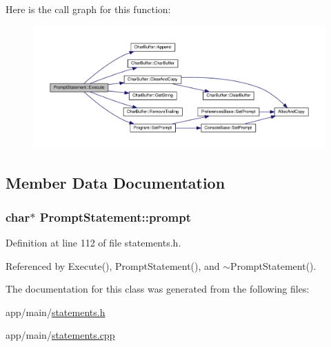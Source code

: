 Here is the call graph for this function\+:\nopagebreak
\begin{figure}[H]
\begin{center}
\leavevmode
\includegraphics[width=350pt]{classPromptStatement_ad315c8cc58132641e9b8a62902566318_cgraph}
\end{center}
\end{figure}




\subsection{Member Data Documentation}
\subsubsection[{\texorpdfstring{prompt}{prompt}}]{\setlength{\rightskip}{0pt plus 5cm}char$\ast$ Prompt\+Statement\+::prompt\hspace{0.3cm}{\ttfamily [private]}}\hypertarget{classPromptStatement_a9430d327c09b2dfa07b5425c183f8837}{}\label{classPromptStatement_a9430d327c09b2dfa07b5425c183f8837}


Definition at line 112 of file statements.\+h.



Referenced by Execute(), Prompt\+Statement(), and $\sim$\+Prompt\+Statement().



The documentation for this class was generated from the following files\+:\begin{DoxyCompactItemize}
\item 
app/main/\hyperlink{statements_8h}{statements.\+h}\item 
app/main/\hyperlink{statements_8cpp}{statements.\+cpp}\end{DoxyCompactItemize}
